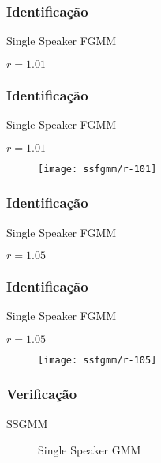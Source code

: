 \begin{frame}
\frametitle{Identificação}
\begin{description}
    \item[SSFGMM] Single Speaker FGMM
    \item $r = 1.01$
\end{description}


\end{frame}

\begin{frame}
\frametitle{Identificação}
\begin{description}
    \item[SSFGMM] Single Speaker FGMM
    \item $r = 1.01$
\end{description}

\begin{figure}[ht]
    \centering
    \texttt{[image: ssfgmm/r-101]}
\end{figure}
\end{frame}

\begin{frame}
\frametitle{Identificação}
\begin{description}
    \item[SSFGMM] Single Speaker FGMM
    \item $r = 1.05$
\end{description}


\end{frame}

\begin{frame}
\frametitle{Identificação}
\begin{description}
    \item[SSFGMM] Single Speaker FGMM
    \item $r = 1.05$
\end{description}

\begin{figure}[ht]
    \centering
    \texttt{[image: ssfgmm/r-105]}
\end{figure}
\end{frame}

\begin{frame}
\frametitle{Verificação}
\begin{description}
    \item[SSGMM] Single Speaker GMM
\end{description}


\end{frame}

